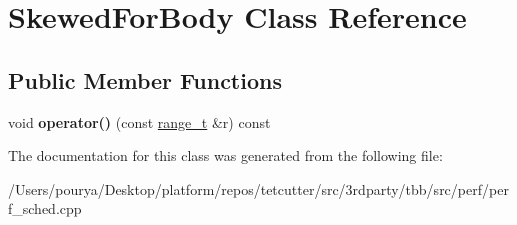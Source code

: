 \hypertarget{classSkewedForBody}{}\section{Skewed\+For\+Body Class Reference}
\label{classSkewedForBody}
\subsection*{Public Member Functions}
\begin{DoxyCompactItemize}
\item 
\hypertarget{classSkewedForBody_a713a550fa18a699ae587d395e5703234}{}void {\bfseries operator()} (const \hyperlink{classtbb_1_1blocked__range}{range\+\_\+t} \&r) const \label{classSkewedForBody_a713a550fa18a699ae587d395e5703234}

\end{DoxyCompactItemize}


The documentation for this class was generated from the following file\+:\begin{DoxyCompactItemize}
\item 
/\+Users/pourya/\+Desktop/platform/repos/tetcutter/src/3rdparty/tbb/src/perf/perf\+\_\+sched.\+cpp\end{DoxyCompactItemize}
